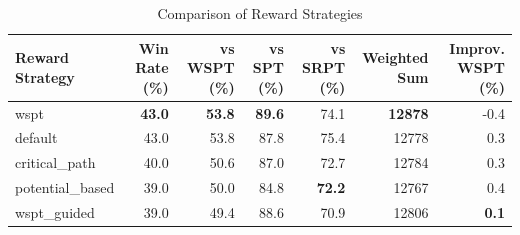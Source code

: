 \begin{table}[htbp]%
\centering%
\begin{tabular}{lrrrrrr}%
\toprule%
\textbf{Reward Strategy}&\textbf{Win Rate (\%)}&\textbf{vs WSPT (\%)}&\textbf{vs SPT (\%)}&\textbf{vs SRPT (\%)}&\textbf{Weighted Sum}&\textbf{Improv. WSPT (\%)}\\%
\midrule%
wspt&\textbf{43.0}&\textbf{53.8}&\textbf{89.6}&74.1&\textbf{12878}&-0.4\\%
default&43.0&53.8&87.8&75.4&12778&0.3\\%
critical_path&40.0&50.6&87.0&72.7&12784&0.3\\%
potential_based&39.0&50.0&84.8&\textbf{72.2}&12767&0.4\\%
wspt_guided&39.0&49.4&88.6&70.9&12806&\textbf{0.1}\\%
\bottomrule%
\end{tabular}%
\caption{Comparison of Reward Strategies}%
\label{tab:rewards}%
\end{table}